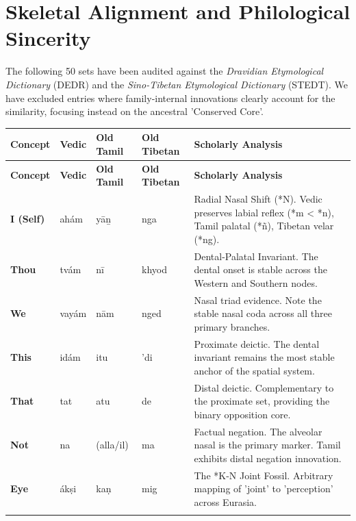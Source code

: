 \documentclass[11pt,oneside,openany]{book}
\begin{document}
\section{Skeletal Alignment and Philological Sincerity}
The following 50 sets have been audited against the \textit{Dravidian Etymological Dictionary} (DEDR) and the \textit{Sino-Tibetan Etymological Dictionary} (STEDT). We have excluded entries where family-internal innovations clearly account for the similarity, focusing instead on the ancestral 'Conserved Core'.

\begin{longtable}{p{} p{} p{} p{} p{}}
\toprule
\textbf{Concept} & \textbf{Vedic} & \textbf{Old Tamil} & \textbf{Old Tibetan} & \textbf{Scholarly Analysis} \\
\midrule
\endfirsthead
\toprule
\textbf{Concept} & \textbf{Vedic} & \textbf{Old Tamil} & \textbf{Old Tibetan} & \textbf{Scholarly Analysis} \\
\midrule
\endhead
\bottomrule
\endfoot

\textbf{I (Self)} & ahám & yāṉ & nga & \small Radial Nasal Shift (*N). Vedic preserves labial reflex (*m < *n), Tamil palatal (*ñ), Tibetan velar (*ng). \\ 
\addlinespace[10pt]

\textbf{Thou} & tvám & nī & khyod & \small Dental-Palatal Invariant. The dental onset is stable across the Western and Southern nodes. \\ 
\addlinespace[10pt]

\textbf{We} & vayám & nām & nged & \small Nasal triad evidence. Note the stable nasal coda across all three primary branches. \\ 
\addlinespace[10pt]

\textbf{This} & idám & itu & 'di & \small Proximate deictic. The dental invariant remains the most stable anchor of the spatial system. \\ 
\addlinespace[10pt]

\textbf{That} & tat & atu & de & \small Distal deictic. Complementary to the proximate set, providing the binary opposition core. \\ 
\addlinespace[10pt]

\textbf{Not} & na & (alla/il) & ma & \small Factual negation. The alveolar nasal is the primary marker. Tamil exhibits distal negation innovation. \\ 
\addlinespace[10pt]

\textbf{Eye} & ákṣi & kaṇ & mig & \small The *K-N Joint Fossil. Arbitrary mapping of 'joint' to 'perception' across Eurasia. \\ 
\addlinespace[10pt]


\end{longtable}
\end{document}
